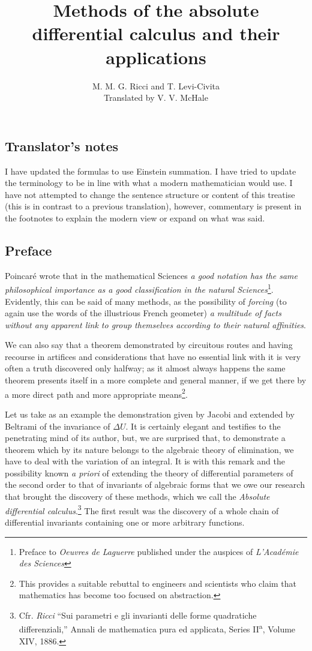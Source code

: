\documentclass{book}
\begin{document}
\title{Methods of the absolute differential calculus and their applications}
\author{M. M. G. Ricci and T. Levi-Civita\\
Translated by V. V. McHale}
\date{}
\maketitle
\tableofcontents
\subsection*{Translator's notes}
I have updated the formulas to use Einstein summation. I have tried to update the terminology to be in line with what a modern mathematician would use. I have not attempted to change the sentence structure or content of this treatise (this is in contrast to a previous translation), however, commentary is present in the footnotes to explain the modern view or expand on what was said.
\subsection*{Preface}
Poincar\'{e} wrote that in the mathematical Sciences \emph{a good notation has the same philosophical importance as a good classification in the natural Sciences}\footnote{Preface to \emph{Oeuvres de Laguerre} published under the auspices of \emph{L'Acad\'{e}mie des Sciences}}. Evidently, this can be said of many methods, as the possibility of \emph{forcing} (to again use the words of the illustrious French geometer) \emph{a multitude of facts without any apparent link to group themselves according to their natural affinities}.

We can also say that a theorem demonstrated by circuitous routes and having recourse in artifices and considerations that have no essential link with it is very often a truth discovered only halfway; as it almost always happens the same theorem presents itself in a more complete and general manner, if we get there by a more direct path and more appropriate means\footnote{This provides a suitable rebuttal to engineers and scientists who claim that mathematics has become too focused on abstraction.}.

Let us take as an example the demonstration given by Jacobi and extended by Beltrami of the invariance of $\Delta U$. It is certainly elegant and testifies to the penetrating mind of its author, but, we are surprised that, to demonstrate a theorem which by its nature belongs to the algebraic theory of elimination, we have to deal with the variation of an integral. It is with this remark and the possibility known \emph{a priori} of extending the theory of differential parameters of the second order to that of invariants of algebraic forms that we owe our research that brought the discovery of these methods, which we call the \emph{Absolute differential calculus}.\footnote{Cfr. \emph{Ricci} ``Sui parametri e gli invarianti delle forme quadratiche differenziali,'' Annali de mathematica pura ed applicata, Series II\textsuperscript{a}, Volume XIV, 1886.} The first result was the discovery of a whole chain of differential invariants containing one or more arbitrary functions.
\end{document}
